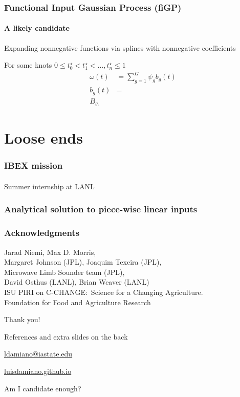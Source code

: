 \documentclass{snedecorbeamer}
\begin{document}
\begin{frame}
  \frametitle{Functional Input Gaussian Process (fiGP)}
  \framesubtitle{A likely candidate}

  Expanding nonnegative functions via splines with nonnegative coefficients

  For some knots $0 \le t^\star_0 < t^\star_1 < \dots, t^\star_n \le 1$
  \begin{align}
    \omega(t)
    &=\sum_{g=1}^{G}\psi_{g}b_g(t) \\
    b_g(t)
    &= \\
    B_{g,}
  \end{align}
\end{frame}

\section{Loose ends}

\begin{frame}
  \frametitle{IBEX mission}
  \framesubtitle{}

  Summer internship at LANL
\end{frame}

\begin{frame}
  \frametitle{Analytical solution to piece-wise linear inputs}
  \framesubtitle{}

\end{frame}

\begin{frame}[c]
  \frametitle{Acknowledgments}
  \centering

  {\small Jarad Niemi, Max D. Morris,\\
    Margaret Johnson (JPL), Joaquim Texeira (JPL), \\
    Microwave Limb Sounder team (JPL),\\
    David Osthus (LANL), Brian Weaver (LANL) \\
    ISU PIRI on C-CHANGE:~Science for a Changing Agriculture.\\
    Foundation for Food and Agriculture Research}

  \vfill

  {\huge Thank you!}

  \vfill

  {\tiny References and extra slides on the back}

  \href{ldamiano@iastate.edu}{
    ldamiano@iastate.edu}

  \href{https://luisdamiano.github.io/}{
    luisdamiano.github.io}

  \vfill

  {\tiny Am I candidate enough?}

\end{frame}
\end{document}
